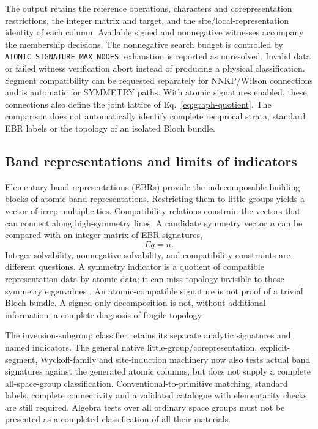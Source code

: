 The output retains the reference operations, characters and
corepresentation restrictions, the integer matrix and target, and
the site/local-representation identity of each column. Available
signed and nonnegative witnesses accompany the membership decisions.
The nonnegative search budget is controlled by
\texttt{ATOMIC\_SIGNATURE\_MAX\_NODES}; exhaustion is reported as
unresolved. Invalid data or failed witness verification abort instead
of producing a physical classification. Segment compatibility can be
requested separately for NNKP/Wilson connections and is automatic for
SYMMETRY paths. With atomic signatures enabled, these connections
also define the joint lattice of Eq.~\eqref{eq:graph-quotient}.
The comparison
does not automatically identify complete reciprocal strata, standard
EBR labels or the topology of an isolated Bloch bundle.

\subsection{Band representations and limits of indicators}
Elementary band representations (EBRs) provide the indecomposable
building blocks of atomic band representations. Restricting them to
little groups yields a vector of irrep multiplicities. Compatibility
relations constrain the vectors that can connect along high-symmetry
lines. A candidate symmetry vector $n$ can be compared with an integer
matrix of EBR signatures,
\begin{equation}
 E q=n .
 \label{eq:ebr-system}
\end{equation}
Integer solvability, nonnegative solvability, and compatibility
constraints are different questions. A symmetry indicator is a
quotient of compatible representation data by atomic data; it can
miss topology invisible to those symmetry eigenvalues
\cite{Bradlyn2017,Po2017}.
An atomic-compatible signature is not proof of a trivial Bloch bundle.
A signed-only decomposition is not, without additional information,
a complete diagnosis of fragile topology.

The inversion-subgroup classifier retains its separate analytic
signatures and named indicators. The general native
little-group/corepresentation, explicit-segment, Wyckoff-family and
site-induction machinery now also tests actual band signatures against
the generated atomic columns, but does not supply a complete
all-space-group classification. Conventional-to-primitive matching,
standard labels, complete connectivity and a validated catalogue with
elementarity checks are still required. Algebra tests over all ordinary
space groups must not be presented as a completed classification
of all their materials.

